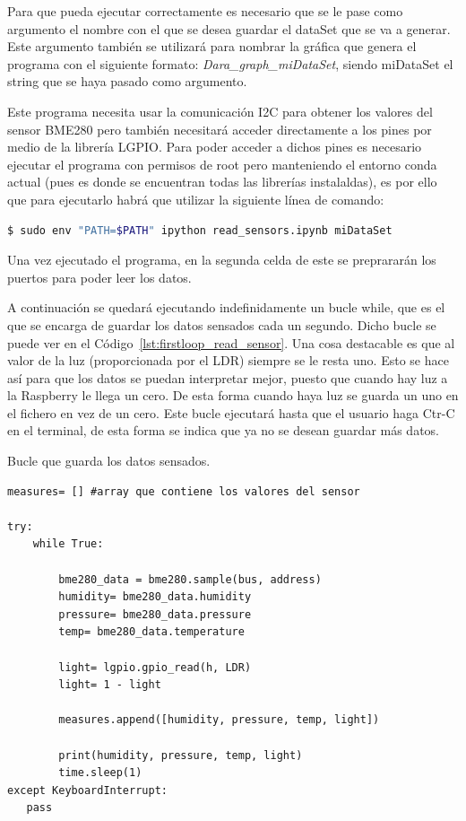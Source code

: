 \documentclass[a4paper, 12pt]{book}
\begin{document}
Para que pueda ejecutar correctamente es necesario que se le pase como argumento el nombre con el que se desea guardar el dataSet que se va a generar. Este argumento también se utilizará para nombrar la gráfica que genera el programa con el siguiente formato: \textit{Dara\_graph\_miDataSet}, siendo miDataSet el string que se haya pasado como argumento.


Este programa necesita usar la comunicación I2C para obtener los valores del sensor BME280 pero también necesitará acceder directamente a los pines por medio de la librería LGPIO. Para poder acceder a dichos pines es necesario ejecutar el programa con permisos de root pero manteniendo el entorno conda actual (pues es donde se encuentran todas las librerías instalaldas), es por ello que para ejecutarlo habrá que utilizar la siguiente línea de comando:  


\begin{lstlisting}[language=bash]
    $ sudo env "PATH=$PATH" ipython read_sensors.ipynb miDataSet
\end{lstlisting}

Una vez ejecutado el programa, en la segunda celda de este se preprararán los puertos para poder leer los datos. 

A continuación se quedará ejecutando indefinidamente un bucle while, que es el que se encarga de guardar los datos sensados cada un segundo. Dicho bucle se puede ver en el Código~\ref{lst:firstloop_read_sensor}. Una cosa destacable es que al valor de la luz (proporcionada por el LDR) siempre se le resta uno. Esto se hace así para que los datos se puedan interpretar mejor, puesto que cuando hay luz a la Raspberry le llega un cero. De esta forma cuando haya luz se guarda un uno en el fichero en vez de un cero. 
Este bucle ejecutará hasta que el usuario haga Ctr-C en el terminal, de esta forma se indica que ya no se desean guardar más datos.

\begin{listing}[h!]
    \caption{Bucle que guarda los datos sensados.}{}
    \label{lst:firstloop_read_sensor}
    \begin{verbatim}
measures= [] #array que contiene los valores del sensor

try:
    while True:

        bme280_data = bme280.sample(bus, address)
        humidity= bme280_data.humidity
        pressure= bme280_data.pressure
        temp= bme280_data.temperature
        
        light= lgpio.gpio_read(h, LDR)
        light= 1 - light
        
        measures.append([humidity, pressure, temp, light])
        
        print(humidity, pressure, temp, light)
        time.sleep(1)
except KeyboardInterrupt:
   pass  
    \end{verbatim}
\end{listing}
\end{document}
